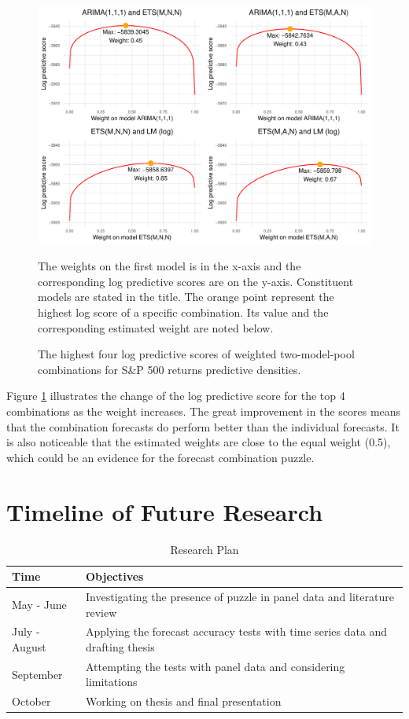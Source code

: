 \documentclass{monashthesis}
\begin{document}
\begin{figure}[ht]
\centering
\caption{The highest four log predictive scores of weighted two-model-pool combinations for S\&P 500 returns predictive densities. }
\includegraphics{figures/best4comb.pdf}
\begin{flushleft}
{\footnotesize The weights on the first model is in the x-axis and the corresponding log predictive scores are on the y-axis. Constituent models are stated in the title. The orange point represent the highest log score of a specific combination. Its value and the corresponding estimated weight are noted below.}\\
\end{flushleft}
\label{fig:best4}
\end{figure}

Figure \ref{fig:best4} illustrates the change of the log predictive score for the top 4 combinations as the weight increases. The great improvement in the scores means that the combination forecasts do perform better than the individual forecasts. It is also noticeable that the estimated weights are close to the equal weight (0.5), which could be an evidence for the forecast combination puzzle.

\hypertarget{timeline-of-future-research}{%
\section{Timeline of Future Research}\label{timeline-of-future-research}}

\begin{table}[htbp]
  \centering
  \caption{Research Plan}
    \begin{tabular}{ll}
    Time  & Objectives \\
    \midrule
    May - June & Investigating the presence of puzzle in panel data and literature review \\
    July - August & Applying the forecast accuracy tests with time series data and drafting thesis  \\
    September & Attempting the tests with panel data and considering limitations \\
    October & Working on thesis and final presentation \\
    \end{tabular}
\end{table}
\end{document}
